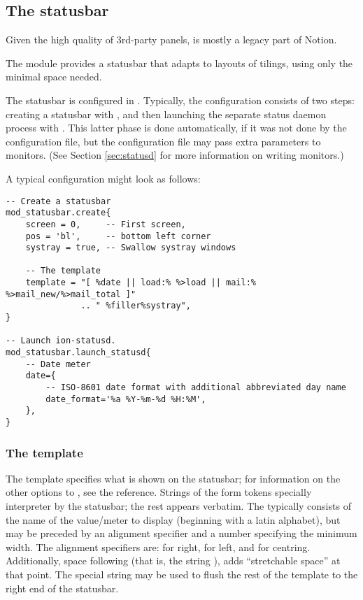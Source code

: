 \subsection{The statusbar}
\label{sec:statusbar}

Given the high quality of 3rd-party panels,  is mostly
a legacy part of Notion.

The  module provides a statusbar that adapts to 
layouts of tilings, using only the minimal space needed. 

The statusbar is configured in . Typically,
the configuration consists of two steps: creating a statusbar with
, and then launching the separate
 status daemon process with 
. This latter phase is done
automatically, if it was not done by the configuration file, but
the configuration file may pass extra parameters to 
monitors. (See Section \ref{sec:statusd} for more information on
writing  monitors.)

A typical  configuration might look as follows:


\begin{verbatim}
-- Create a statusbar
mod_statusbar.create{
    screen = 0,     -- First screen, 
    pos = 'bl',     -- bottom left corner
    systray = true, -- Swallow systray windows

    -- The template
    template = "[ %date || load:% %>load || mail:% %>mail_new/%>mail_total ]"
               .. " %filler%systray",
}

-- Launch ion-statusd. 
mod_statusbar.launch_statusd{
    -- Date meter
    date={
        -- ISO-8601 date format with additional abbreviated day name
        date_format='%a %Y-%m-%d %H:%M',
    },      
}
\end{verbatim}


\subsubsection{The template}

The template specifies what is shown on the statusbar; for information
on the other options to , see the reference. 
Strings of the form  tokens specially interpreter by
the statusbar; the rest appears verbatim. The  typically
consists of the name of the value/meter to display (beginning with a latin
alphabet), but may be preceded by an alignment specifier and a number
specifying the minimum width. The alignment specifiers are: \codestr{>}
for right, \codestr{<} for left,  and \codestr{|} for centring. Additionally,
space following \codestr{\%} (that is, the string \codestr{\% }), adds
``stretchable space'' at that point. The special string 
may be used to flush the rest of the template to the right end of 
the statusbar. 


